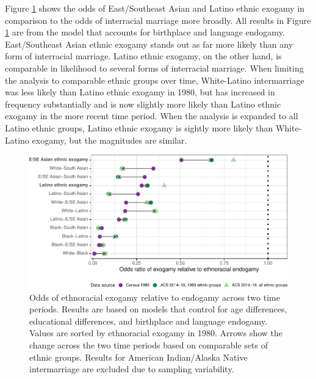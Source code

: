 \documentclass[11pt,]{article}
\begin{document}
Figure \ref{fig:changes-intermar} shows the odds of East/Southeast Asian and Latino ethnic exogamy in comparison to the odds of interracial marriage more broadly. All results in Figure \ref{fig:changes-intermar} are from the model that accounts for birthplace and language endogamy. East/Southeast Asian ethnic exogamy stands out as far more likely than any form of interracial marriage. Latino ethnic exogamy, on the other hand, is comparable in likelihood to several forms of interracial marriage. When limiting the analysis to comparable ethnic groups over time, White-Latino intermarriage was less likely than Latino ethnic exogamy in 1980, but has increased in frequency substantially and is now slightly more likely than Latino ethnic exogamy in the more recent time period. When the analysis is expanded to all Latino ethnic groups, Latino ethnic exogamy is sightly more likely than White-Latino exogamy, but the magnitudes are similar.

\begin{figure}
\centering
\includegraphics{main_files/figure-latex/changes-intermar-1.pdf}
\caption{\label{fig:changes-intermar}Odds of ethnoracial exogamy relative to endogamy across two time periods. Results are based on models that control for age differences, educational differences, and birthplace and language endogamy. Values are sorted by ethnoracial exogamy in 1980. Arrows show the change across the two time periods based on comparable sets of ethnic groups. Results for American Indian/Alaska Native intermarriage are excluded due to sampling variability.}
\end{figure}
\end{document}
